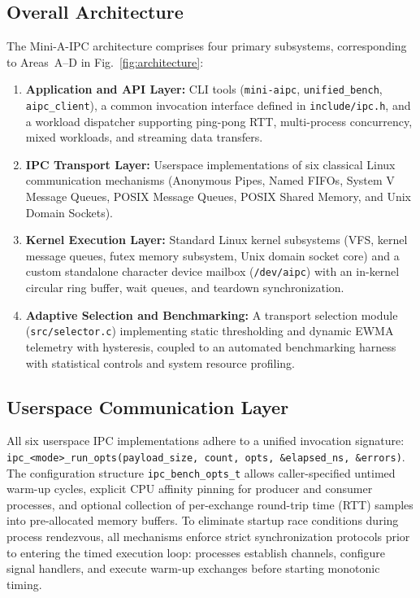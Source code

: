 \subsection{Overall Architecture}
The Mini-A-IPC architecture comprises four primary subsystems, corresponding to Areas~A--D in Fig.~\ref{fig:architecture}:
\begin{enumerate}[label=(\Alph*),leftmargin=*,noitemsep,topsep=1.5pt]
    \item \textbf{Application and API Layer:} CLI tools (\texttt{mini-aipc}, \texttt{unified\_bench}, \texttt{aipc\_client}), a common invocation interface defined in \texttt{include/ipc.h}, and a workload dispatcher supporting ping-pong RTT, multi-process concurrency, mixed workloads, and streaming data transfers.
    \item \textbf{IPC Transport Layer:} Userspace implementations of six classical Linux communication mechanisms (Anonymous Pipes, Named FIFOs, System V Message Queues, POSIX Message Queues, POSIX Shared Memory, and Unix Domain Sockets).
    \item \textbf{Kernel Execution Layer:} Standard Linux kernel subsystems (VFS, kernel message queues, futex memory subsystem, Unix domain socket core) and a custom standalone character device mailbox (\texttt{/dev/aipc}) with an in-kernel circular ring buffer, wait queues, and teardown synchronization.
    \item \textbf{Adaptive Selection and Benchmarking:} A transport selection module (\texttt{src/selector.c}) implementing static thresholding and dynamic EWMA telemetry with hysteresis, coupled to an automated benchmarking harness with statistical controls and system resource profiling.
\end{enumerate}

\subsection{Userspace Communication Layer}
All six userspace IPC implementations adhere to a unified invocation signature: \texttt{ipc\_<mode>\_run\_opts(payload\_size, count, opts, \&elapsed\_ns, \&errors)}. The configuration structure \texttt{ipc\_bench\_opts\_t} allows caller-specified untimed warm-up cycles, explicit CPU affinity pinning for producer and consumer processes, and optional collection of per-exchange round-trip time (RTT) samples into pre-allocated memory buffers. 
To eliminate startup race conditions during process rendezvous, all mechanisms enforce strict synchronization protocols prior to entering the timed execution loop: processes establish channels, configure signal handlers, and execute warm-up exchanges before starting monotonic timing.

